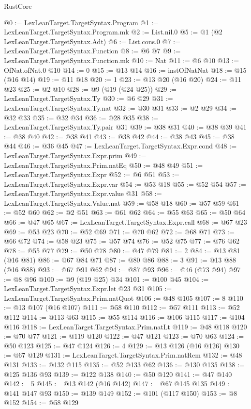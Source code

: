 \begin{lexlean}{RustCore}
\begin{coremodule}
@0 := LexLeanTarget.TargetSyntax.Program
@1 := LexLeanTarget.TargetSyntax.Program.mk
@2 := List.nil.{0}
@5 := @1 (@2 LexLeanTarget.TargetSyntax.Adt)
@6 := List.cons.{0}
@7 := LexLeanTarget.TargetSyntax.Function
@8 := @6 @7
@9 := LexLeanTarget.TargetSyntax.Function.mk
@10 := Nat
@11 := @6 @10
@13 := OfNat.ofNat.{0} @10
@14 := 0
@15 := @13 @14
@16 := instOfNatNat
@18 := @15 (@16 @14)
@19 := @11 @18
@20 := 1
@23 := @13 @20 (@16 @20)
@24 := @11 @23
@25 := @2 @10
@28 := @9 (@19 (@24 @25))
@29 := LexLeanTarget.TargetSyntax.Ty
@30 := @6 @29
@31 := LexLeanTarget.TargetSyntax.Ty.nat
@32 := @30 @31
@33 := @2 @29
@34 := @32 @33
@35 := @32 @34
@36 := @28 @35
@38 := LexLeanTarget.TargetSyntax.Ty.pair @31
@39 := @38 @31
@40 := @38 @39
@41 := @38 @40
@42 := @38 @41
@43 := @38 @42
@44 := @38 @43
@45 := @38 @44
@46 := @36 @45
@47 := LexLeanTarget.TargetSyntax.Expr.cond
@48 := LexLeanTarget.TargetSyntax.Expr.prim
@49 := LexLeanTarget.TargetSyntax.Prim.natEq
@50 := @48 @49
@51 := LexLeanTarget.TargetSyntax.Expr
@52 := @6 @51
@53 := LexLeanTarget.TargetSyntax.Expr.var
@54 := @53 @18
@55 := @52 @54
@57 := LexLeanTarget.TargetSyntax.Expr.value @31
@58 := LexLeanTarget.TargetSyntax.Value.nat
@59 := @58 @18
@60 := @57 @59
@61 := @52 @60
@62 := @2 @51
@63 := @61 @62
@64 := @55 @63
@65 := @50 @64
@66 := @47 @65
@67 := LexLeanTarget.TargetSyntax.Expr.call
@68 := @67 @23
@69 := @53 @23
@70 := @52 @69
@71 := @70 @62
@72 := @68 @71
@73 := @66 @72
@74 := @58 @23
@75 := @57 @74
@76 := @52 @75
@77 := @76 @62
@78 := @55 @77
@79 := @50 @78
@80 := @47 @79
@81 := 2
@84 := @13 @81 (@16 @81)
@86 := @67 @84 @71
@87 := @80 @86
@88 := 3
@91 := @13 @88 (@16 @88)
@93 := @67 @91 @62
@94 := @87 @93
@96 := @46 (@73 @94)
@97 := @8 @96
@100 := @9 (@19 @25) @34
@101 := @100 @45
@104 := LexLeanTarget.TargetSyntax.Expr.let @23 @31
@105 := LexLeanTarget.TargetSyntax.Prim.natQuot
@106 := @48 @105
@107 := 8
@110 := @13 @107 (@16 @107)
@111 := @58 @110
@112 := @57 @111
@113 := @52 @112
@114 := @113 @63
@115 := @55 @114
@116 := @106 @115
@117 := @104 @116
@118 := LexLeanTarget.TargetSyntax.Prim.natLt
@119 := @48 @118
@120 := @70 @77
@121 := @119 @120
@122 := @47 @121
@123 := @70 @63
@124 := @50 @123
@125 := @47 @124
@126 := 4
@129 := @13 @126 (@16 @126)
@130 := @67 @129
@131 := LexLeanTarget.TargetSyntax.Prim.natRem
@132 := @48 @131
@133 := @132 @115
@135 := @52 @133 @62
@136 := @130 @135
@138 := @125 @136 @93
@139 := @122 @138
@140 := @50 @120
@141 := @47 @140
@142 := 5
@145 := @13 @142 (@16 @142)
@147 := @67 @145 @135
@149 := @141 @147 @93
@150 := @139 @149
@152 := @101 (@117 @150)
@153 := @8 @152
@154 := @58 @129

\end{coremodule}
\end{lexlean}
